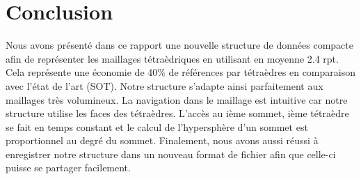 \section{Conclusion}
\noindent
Nous avons présenté dans ce rapport une nouvelle structure de données compacte afin de représenter les maillages tétraèdriques en utilisant en moyenne 2.4 rpt. Cela représente une économie de 40\% de références par tétraèdres en comparaison avec l'état de l'art (SOT). Notre structure s'adapte ainsi parfaitement aux maillages très volumineux. La navigation dans le maillage est intuitive car notre structure utilise les faces des tétraèdres. L'accès au ième sommet, ième tétraèdre se fait en temps constant et le calcul de l'hypersphère d'un sommet est proportionnel au degré du sommet. Finalement, nous avons aussi réussi à enregistrer notre structure dans un nouveau format de fichier afin que celle-ci puisse se partager facilement.